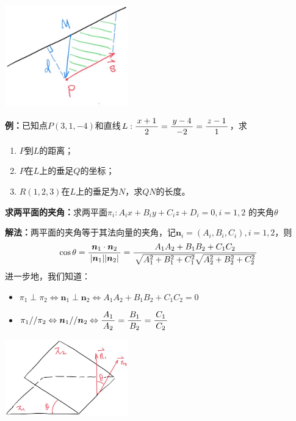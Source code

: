 \begin{center}
	\includegraphics[width=0.4\textwidth]{./images/ch8/pld.jpg}
\end{center}

{\bf 例：}已知点$P(3,1,-4)$和直线$L:\displaystyle\frac{\,{x+1}\,}{\,{2}\,}=\displaystyle\frac{\,{y-4}\,}{\,{-2}\,}=\displaystyle\frac{\,{z-1}\,}{\,{1}\,}$，求
\begin{enumerate}[(1)]
  \setlength{\itemindent}{1cm}
  \item $P$到$L$的距离；
  \item $P$在$L$上的垂足$Q$的坐标；
  \item $R(1,2,3)$在$L$上的垂足为$N$，求$QN$的长度。
\end{enumerate}

\begin{thx}
	{\bf 求两平面的夹角：}求两平面$\pi_i:A_ix+B_iy+C_iz+D_i=0,i=1,2$
	的夹角$\theta$
	
	{\bf 解法：}两平面的夹角等于其法向量的夹角，记$\bm{n}_i=(A_i,B_i,C_i),i=1,2$，则
	$$\cos\theta=\displaystyle\frac{\,{\bm{n}_1\cdot\bm{n}_2}\,}{\,{|\bm{n}_1||\bm{n}_2|}\,}
	=\displaystyle\frac{\,{A_1A_2+B_1B_2+C_1C_2}\,}{\,{\sqrt{A_1^2+B_1^2+C_1^2}
	\sqrt{A_2^2+B_2^2+C_2^2}}\,}$$
	进一步地，我们知道：
	\begin{itemize}
	  \item $\pi_1\perp\pi_2 \Leftrightarrow\bm{n}_1\perp\bm{n}_2 
		  \Leftrightarrow A_1A_2+B_1B_2+C_1C_2=0$
	  \item $\pi_1//\pi_2 \Leftrightarrow\bm{n}_1//\bm{n}_2 
		  \Leftrightarrow\displaystyle\frac{\,{A_1}\,}{\,{A_2}\,}=\displaystyle\frac{\,{B_1}\,}{\,{B_2}\,}=\displaystyle\frac{\,{C_1}\,}{\,{C_2}\,}$
	\end{itemize}
\end{thx}

\begin{center}
	\includegraphics[width=0.4\textwidth]{./images/ch8/ppt.jpg}
\end{center}

